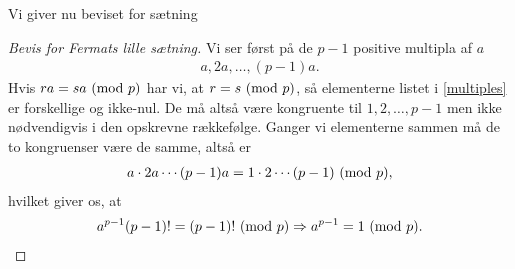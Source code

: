 Vi giver nu beviset for sætning 
\begin{proof}[Bevis for Fermats lille sætning]
Vi ser først på de $p-1$ positive multipla af $a$
\begin{align}
	\label{multiples}
	a, 2a, \ldots, (p-1)a.
\end{align}
Hvis $ra = sa \ (\mathrm{mod} \ p)$ har vi, at $r = s \ (\mathrm{mod} \ p)$, så elementerne listet i \eqref{multiples} er forskellige og ikke-nul. De må altså være kongruente til $1, 2, \ldots, p-1$ men ikke nødvendigvis i den opskrevne rækkefølge. Ganger vi elementerne sammen må de to kongruenser være de samme, altså er
\begin{align*}
	a \cdot 2a \cdots (p-1)a = 1 \cdot 2 \cdots (p-1) \ (\mathrm{mod} \ p),
\end{align*}
hvilket giver os, at 
\begin{align*}
	a^{p-1} (p-1)! = (p-1)! \ (\mathrm{mod} \ p) \Rightarrow a^{p-1} = 1 \ (\mathrm{mod} \ p).
\end{align*}


\end{proof}
